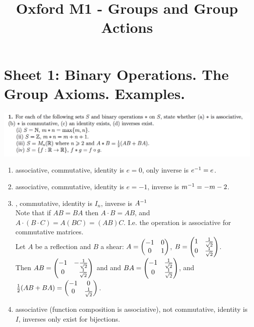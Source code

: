 \documentclass[12pt]{article}
\begin{document}
\title{Oxford M1 - Groups and Group Actions }
\author{}
\date{}
\maketitle

\section{Sheet 1: Binary Operations. The Group Axioms. Examples.}

\begin{mdframed}
\includegraphics[width=400pt]{img/oxford-prelims-M1-groups-1-1.png}
\end{mdframed}
\begin{enumerate}[label=(\roman*)]
\item associative, commutative, identity is $e = 0$, only inverse is $e^{-1} = e$.
\item associative, commutative, identity is $e = -1$, inverse is $m^{-1} = -m - 2$.
\item {}, commutative, identity is $I_n$, inverse is $A^{-1}$\\
  Note that if $AB = BA$ then $A\cdot B = AB$, and $A\cdot(B\cdot C) = A(BC) = (AB)C$. I.e. the
  operation is associative for commutative matrices.\\

  Let $A$ be a reflection and $B$ a shear:
  $A = \begin{pmatrix}-1 & 0\\0 & 1\\ \end{pmatrix}$, $B = \begin{pmatrix}1 & \frac{1}{\sqrt{2}}\\0 & \frac{1}{\sqrt{2}}\\ \end{pmatrix}$.\\
  Then $AB = \begin{pmatrix}-1 & -\frac{1}{\sqrt{2}}\\0 & ~~\frac{1}{\sqrt{2}}\\ \end{pmatrix}$ and
  and  $BA = \begin{pmatrix}-1 & \frac{1}{\sqrt{2}}\\0 & \frac{1}{\sqrt{2}}\\ \end{pmatrix}$,
  and $\frac{1}{2}(AB + BA) = \begin{pmatrix}-1 & 0\\0 & \frac{1}{\sqrt{2}}\\ \end{pmatrix}$.\\

\item associative (function composition is associative), not commutative, identity is $I$, inverses
  only exist for bijections.
\end{enumerate}
\end{document}

